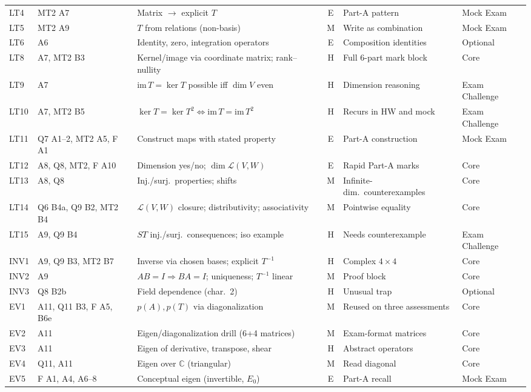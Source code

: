 {\begin{longtable}{@{}l p{2.6cm} p{5.2cm} c p{3.9cm} p{1.7cm}@{}}
LT4 & MT2 A7 & Matrix $\to$ explicit $T$ & E & Part-A pattern & Mock Exam\\
LT5 & MT2 A9 & $T$ from relations (non-basis) & M & Write as combination & Mock Exam\\
LT6 & A6 & Identity, zero, integration operators & E & Composition identities & Optional\\
LT8 & A7, MT2 B3 & Kernel/image via coordinate matrix; rank--nullity & H & Full 6-part mark block & Core\\
LT9 & A7 & $\mathrm{im}\,T=\ker T$ possible iff $\dim V$ even & H & Dimension reasoning & Exam Challenge\\
LT10 & A7, MT2 B5 & $\ker T=\ker T^2\iff\mathrm{im}\,T=\mathrm{im}\,T^2$ & H & Recurs in HW and mock & Exam Challenge\\
LT11 & Q7 A1--2, MT2 A5, F A1 & Construct maps with stated property & E & Part-A construction & Mock Exam\\
LT12 & A8, Q8, MT2, F A10 & Dimension yes/no; $\dim\mathcal L(V,W)$ & E & Rapid Part-A marks & Core\\
LT13 & A8, Q8 & Inj./surj.\ properties; shifts & M & Infinite-dim.\ counterexamples & Core\\
LT14 & Q6 B4a, Q9 B2, MT2 B4 & $\mathcal L(V,W)$ closure; distributivity; associativity & M & Pointwise equality & Core\\
LT15 & A9, Q9 B4 & $ST$ inj./surj.\ consequences; iso example & H & Needs counterexample & Exam Challenge\\
INV1 & A9, Q9 B3, MT2 B7 & Inverse via chosen bases; explicit $T^{-1}$ & H & Complex $4\times4$ & Core\\
INV2 & A9 & $AB=I\Rightarrow BA=I$; uniqueness; $T^{-1}$ linear & M & Proof block & Core\\
INV3 & Q8 B2b & Field dependence (char.\ 2) & H & Unusual trap & Optional\\
EV1 & A11, Q11 B3, F A5, B6e & $p(A),p(T)$ via diagonalization & M & Reused on three assessments & Core\\
EV2 & A11 & Eigen/diagonalization drill (6+4 matrices) & M & Exam-format matrices & Core\\
EV3 & A11 & Eigen of derivative, transpose, shear & H & Abstract operators & Core\\
EV4 & Q11, A11 & Eigen over $\mathbb C$ (triangular) & M & Read diagonal & Core\\
EV5 & F A1, A4, A6--8 & Conceptual eigen (invertible, $E_0$) & E & Part-A recall & Mock Exam\\

\end{longtable}}
